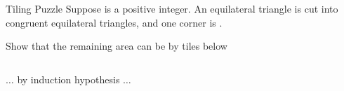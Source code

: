 
\begin{frame}
  \begin{center}
    \begin{exampleblock}{Tiling Puzzle}
      Suppose  is a positive integer.
      An equilateral triangle is cut into 
      congruent equilateral triangles,
      and one corner is .

      \vspace{0.20cm}
      Show that the remaining area can be  by tiles below
    \end{exampleblock}

    \begin{columns}
    \end{columns}
  \end{center}
\end{frame}

\begin{frame}{}

  \pause
  \begin{columns}
      \pause
  \end{columns}
\end{frame}

\begin{frame}
  \begin{center}
    \begin{description}
      \setlength{\itemsep}{15pt}
      \item[Base Case:]
      \item[Induction Hypothesis:]
      \item[Induction Step:] $\dots$ by induction hypothesis $\dots$
    \end{description}
  \end{center}
\end{frame}
